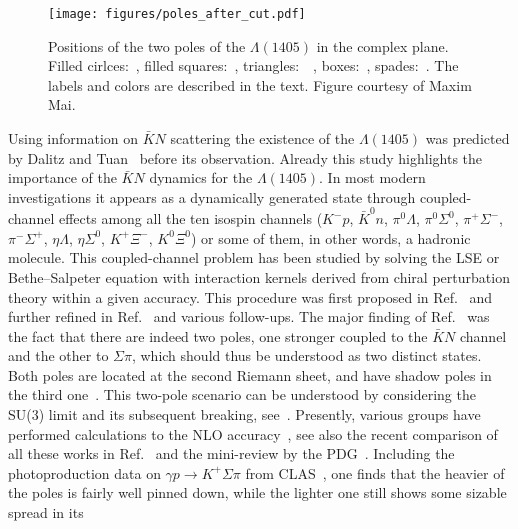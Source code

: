 \begin{figure}[t!]
\begin{center}
\texttt{[image: figures/poles\_after\_cut.pdf]}
\caption{Positions of the two poles of the $\Lambda(1405)$ in the
complex plane. Filled cirlces:~\cite{Borasoy:2006sr},
filled squares:~\cite{Ikeda:2012au}, triangles:~~\cite{Guo:2012vv},
boxes:~\cite{Mai:2014xna}, spades:~\cite{Roca:2013av}. The labels and
colors are described in the text. Figure courtesy of Maxim Mai.
}
\label{fig:twopole}
\end{center}
\end{figure}

Using information on $\bar KN$ scattering the existence of the $\Lambda(1405)$
was predicted by Dalitz and Tuan~\cite{Dalitz:1959dn,Dalitz:1960du}  before its
observation.
Already this study highlights the importance of the $\bar K N$ dynamics for the
$\Lambda(1405)$. In most modern investigations it appears as a dynamically
generated state through coupled-channel effects among all the ten isospin
channels ($K^-p$, $\bar{K}^0n$, $\pi^0\Lambda$, $\pi^0\Sigma^0$,
$\pi^+\Sigma^-$, $\pi^-\Sigma^+$, $\eta\Lambda$, $\eta\Sigma^0$, $K^+\Xi^-$,
$K^0\Xi^0$) or some of them, in other words, a hadronic molecule. This
coupled-channel problem has been studied by solving the LSE or Bethe--Salpeter
equation with interaction kernels derived from chiral perturbation theory within
a given accuracy. This procedure was first proposed in Ref.~\cite{Kaiser:1995eg}
and further refined in Ref.~\cite{Oller:2000fj} and various follow-ups.
The major finding of Ref.~\cite{Oller:2000fj} was the fact that there are indeed
two poles, one stronger coupled to the $\bar KN$ channel and the other to
$\Sigma\pi$, which should thus be understood as two distinct states.
Both poles are located at the second Riemann sheet, and have shadow poles in
the third one~\cite{Oller:2000fj}.
This two-pole scenario can be understood by considering the SU(3) limit and its
subsequent breaking, see~\cite{Jido:2003cb}. Presently, various groups have
performed calculations to the NLO
accuracy~\cite{Ikeda:2012au,Guo:2012vv,Mai:2012dt}, see  also the recent
comparison of all these works in Ref.~\cite{Cieply:2016jby}
 and the mini-review by the PDG~\cite{Olive:2016xmw}. Including
the photoproduction data on $\gamma p\to K^+ \Sigma\pi$ from
CLAS~\cite{Moriya:2013eb}, one finds that the heavier of the poles is fairly
well pinned down, while the lighter one still shows some sizable spread in its

